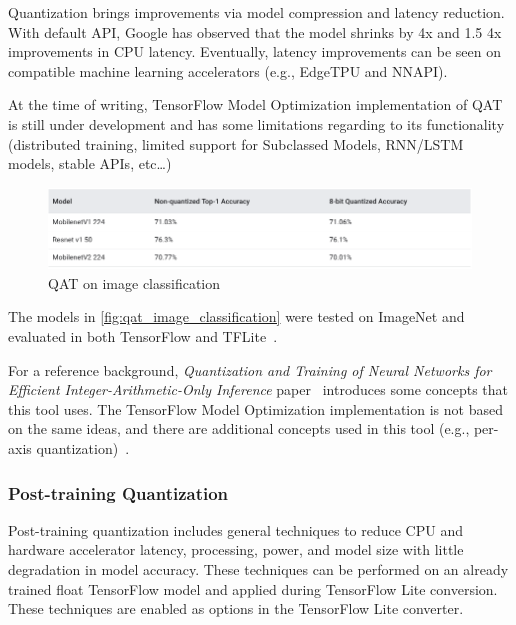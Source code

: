 Quantization brings improvements via model compression and latency reduction.
With default API, Google has observed that the model shrinks by 4x and 1.5 \-
4x improvements in CPU latency. Eventually, latency improvements can be seen on
compatible machine learning accelerators (e.g., EdgeTPU and NNAPI).

At the time of writing, TensorFlow Model Optimization implementation of QAT is
still under development and has some limitations regarding to its functionality
(distributed training, limited support for Subclassed Models, RNN/LSTM models,
stable APIs, etc\ldots)

\begin{figure}[ht]
    \includegraphics[width=\textwidth]{images/introduction/qat_image_classification.png}
    \centering
    \caption{QAT on image classification}\label{fig:qat_image_classification}
\end{figure}

The models in \autoref{fig:qat_image_classification} were tested on ImageNet
and evaluated in both TensorFlow and TFLite~\cite{tfmot:quantization_training}.

For a reference background, \textit{Quantization and Training
of Neural Networks for Efficient Integer-Arithmetic-Only Inference}
paper~\cite{Jacob_2018} introduces some concepts that this tool uses.
The TensorFlow Model Optimization implementation is not based on the same
ideas, and there are additional concepts used in this tool (e.g., per-axis
quantization)~\cite{tfmot:quantization_training}.

\subsubsection{Post-training Quantization}
Post-training quantization includes general techniques to reduce CPU and
hardware accelerator latency, processing, power, and model size with little
degradation in model accuracy. These techniques can be performed on an
already trained float TensorFlow model and applied during TensorFlow Lite
conversion. These techniques are enabled as options in the TensorFlow Lite
converter.

